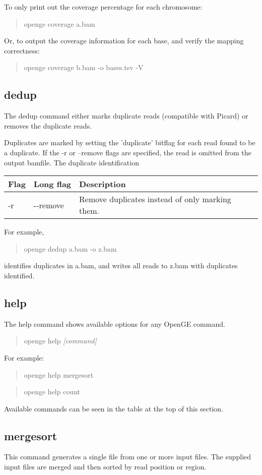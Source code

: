 \documentclass[11pt]{article}
\newcommand {\cmd}[1] {\begin{quote}#1\end{quote}}
\begin{document}
To only print out the coverage percentage for each chromosome:
\cmd{openge coverage a.bam}

Or, to output the coverage information for each base, and verify the mapping correctness:
\cmd{openge coverage b.bam -o bases.tsv -V}

\subsection {dedup}
The dedup command either marks duplicate reads (compatible with Picard) or removes the duplicate reads. 

Duplicates are marked by setting the 'duplicate' bitflag for each read found to be a duplicate. If the -r or --remove flags are specified, the read is omitted from the output bamfile. The duplicate identification 

\begin{center}
\begin{tabular}{llp{3.5in}}
\hline
Flag&Long flag&Description\\ \hline
-r&{-}{-}remove&Remove duplicates instead of only marking them.\\
\end{tabular}
\end{center}

For example,
\cmd{openge dedup a.bam -o z.bam} 
identifies duplicates in a.bam, and writes all reads to z.bam with duplicates identified.

\subsection {help}
The help command shows available options for any OpenGE command. 

\cmd{openge help \textit{[command]}}

For example:

\cmd{openge help mergesort}

\cmd{openge help count}

Available commands can be seen in the table at the top of this section.


\subsection {mergesort}
This command generates a single file from one or more input files. The supplied input files are merged and then sorted by read position or region.
\end{document}
